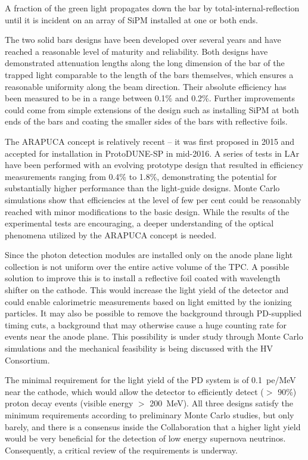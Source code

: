  A fraction of the green light propagates down the bar by total-internal-reflection until it is incident on an
array of SiPM installed at one or both ends.

The two solid bars designs have been developed over several years and have reached a reasonable level of maturity and reliability. 
Both designs have demonstrated attenuation lengths along the long dimension of the bar of the 
trapped light comparable to the length of the bars themselves, which ensures a reasonable uniformity along the beam direction. Their absolute efficiency has been measured to be in a range between \num{0.1}\% and \num{0.2}\%.
Further  improvements could come from simple extensions of the design such as installing SiPM at both ends of the bars and coating the smaller sides of the  bars with reflective foils. 

The ARAPUCA concept is relatively recent -- it was first proposed in 2015 and accepted for installation in ProtoDUNE-SP in mid-2016. A series of tests in LAr have been performed with an evolving prototype design that resulted in efficiency measurements ranging from 
\num{0.4}\% to \num{1.8}\%, demonstrating the potential for substantially higher performance than the light-guide designs. Monte Carlo simulations show that efficiencies at the level of few per cent could be reasonably reached with minor modifications to the basic design. 
While the results of the experimental tests are encouraging, a deeper understanding of the optical phenomena utilized by the ARAPUCA concept is needed.

Since the photon detection modules are installed only on the anode plane light collection is not uniform over the entire active volume of the TPC. A possible solution to improve this is to install a reflective foil coated with wavelength shifter on the cathode.
This would increase the light yield of the detector and could enable calorimetric measurements based on light emitted by the ionizing particles. It may also be possible to remove the  background through PD-supplied timing cuts, a background that may otherwise cause a huge counting rate for events near  the anode plane. This possibility is under study through Monte Carlo simulations and the mechanical feasibility is being discussed with the HV Consortium.

The minimal requirement for the light yield of the PD system is of \SI{0.1}{pe/MeV} 
near the cathode, which would allow the detector to efficiently  detect ($>$ \num{90}\%) 
proton decay events (visible energy $>$ \SI{200}{MeV}). All three designs satisfy
the minimum requirements according to preliminary Monte Carlo 
studies, but only barely, and there is a consensus inside the Collaboration that a higher 
light yield would be very beneficial for the detection of low energy supernova 
neutrinos.  Consequently, a critical review of the requirements is underway.

